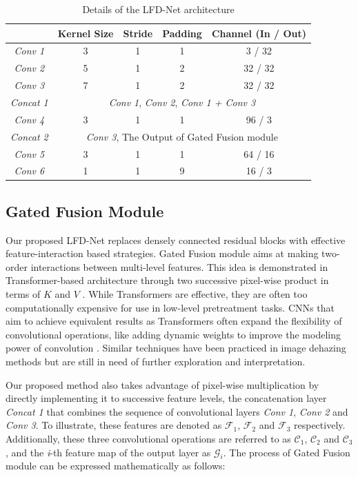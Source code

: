 \documentclass[lettersize,journal]{IEEEtran}
\begin{document}
\begin{table}[p!th]
    \caption{Details of the LFD-Net architecture\label{tab:table1}}
    \centering
    \begin{tabular}{ccccc}
    \hline
      & Kernel Size & Stride & Padding & Channel (In / Out)\\
    \hline
    \textit{Conv 1} & 3 & 1 & 1 & 3 / 32\\
    \textit{Conv 2} & 5 & 1 & 2 & 32 / 32\\
    \textit{Conv 3} & 7 & 1 & 2 & 32 / 32\\
    \textit{Concat 1} &
    \multicolumn{4}{c}{\textit{Conv 1}, \textit{Conv 2}, \textit{Conv 1 + Conv 3}}\\
    \textit{Conv 4} & 3 & 1 & 1 & 96 / 3\\
    \textit{Concat 2} &
    \multicolumn{4}{c}{\textit{Conv 3}, The Output of Gated Fusion module}\\
    \textit{Conv 5} & 3 & 1 & 1 & 64 / 16\\
    \textit{Conv 6} & 1 & 1 & 9 & 16 / 3\\
    \hline
    \end{tabular}
\end{table}

\subsection{Gated Fusion Module}
Our proposed LFD-Net replaces densely connected residual blocks with effective feature-interaction based strategies. Gated Fusion module aims at making two-order interactions between multi-level features. This idea is demonstrated in Transformer-based architecture through two successive pixel-wise product in terms of $K$ and $V$ \cite{vaswani2017attention}. While Transformers are effective, they are often too computationally expensive for use in low-level pretreatment tasks. CNNs that aim to achieve equivalent results as Transformers often expand the flexibility of convolutional operations, like adding dynamic weights to improve the modeling power of convolution \cite{hu2018squeeze, chen2020dynamic, rao2022hornet}. Similar techniques have been practiced in image dehazing methods \cite{ren2018gated, chen2019gated} but are still in need of further exploration and interpretation. 

Our proposed method also takes advantage of pixel-wise multiplication by directly implementing it to successive feature levels, the concatenation layer \textit{Concat 1} that combines the sequence of convolutional layers \textit{Conv 1}, \textit{Conv 2} and \textit{Conv 3}. To illustrate, these features are denoted as $\mathcal{F}_1$, $\mathcal{F}_2$ and $\mathcal{F}_3$ respectively. Additionally, these three convolutional operations are referred to as $\mathcal{C}_1$, $\mathcal{C}_2$ and $\mathcal{C}_3$, and the \textit{i}-th feature map of the output layer as $\mathcal{G}_i$. The process of Gated Fusion module can be expressed mathematically as follows:
\end{document}
